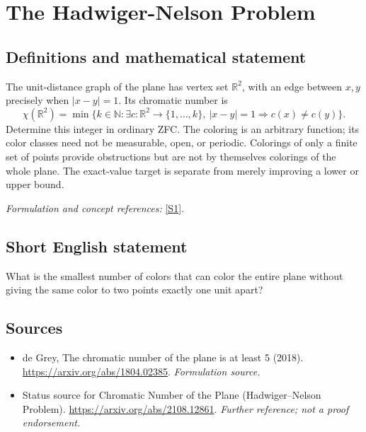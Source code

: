 \documentclass[11pt]{article}
\begin{document}
\section*{\texorpdfstring{The Hadwiger-Nelson Problem}{The Hadwiger-Nelson Problem}}\label{10}
\subsection{Definitions and mathematical statement}
The unit-distance graph of the plane has vertex set ${\mathbb{R}}^2$, with an edge between $x,y$ precisely when $|x-y|=1$. Its chromatic number is
\[
 \chi({\mathbb{R}}^2)=\min\{k\in{\mathbb{N}}:\exists c:{\mathbb{R}}^2\to\{1,\ldots,k\},
 \ |x-y|=1\Rightarrow c(x)\ne c(y)\}.
\]
Determine this integer in ordinary ZFC. The coloring is an arbitrary function; its color classes need not be measurable, open, or periodic. Colorings of only a finite set of points provide obstructions but are not by themselves colorings of the whole plane. The exact-value target is separate from merely improving a lower or upper bound.
\par\smallskip\textit{Formulation and concept references:} \href{https://arxiv.org/abs/1804.02385}{[S1]}.

\subsection{Short English statement}
What is the smallest number of colors that can color the entire plane without giving the same color to two points exactly one unit apart?
\subsection{Sources}
\begin{itemize}
\item[S1]de Grey, The chromatic number of the plane is at least 5 (2018).
\url{https://arxiv.org/abs/1804.02385}.
\textit{Formulation source.}
\item[S2]Status source for Chromatic Number of the Plane (Hadwiger--Nelson Problem).
\url{https://arxiv.org/abs/2108.12861}.
\textit{Further reference; not a proof endorsement.}
\end{itemize}
\end{document}
